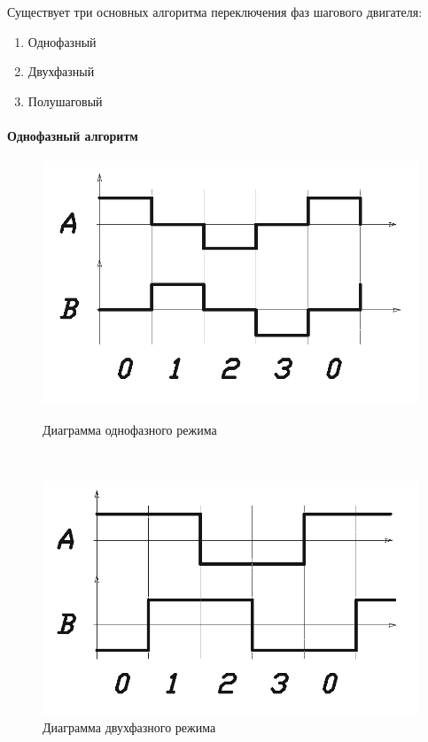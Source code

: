 Существует три основных алгоритма переключения фаз шагового двигателя:

\begin{enumerate}
    \item Однофазный
    \item Двухфазный
    \item Полушаговый
\end{enumerate}

\paragraph{Однофазный алгоритм}

\begin{figure}
    \centering
    \begin{minipage}{0.45\textwidth}
        \centering
        \includegraphics[width=\linewidth, keepaspectratio]
                        {./src/pictures/control_algo/one_phase_algo}
        \caption{Диаграмма однофазного режима}
        \label{pic_one_phase_algo}
    \end{minipage}~
    \begin{minipage}{0.45\textwidth}
        \centering
        \includegraphics[width=\linewidth, keepaspectratio]
                        {./src/pictures/control_algo/two_phase_algo}
        \caption{Диаграмма двухфазного режима}
        \label{pic_two_phase_algo}
    \end{minipage}
\end{figure}

